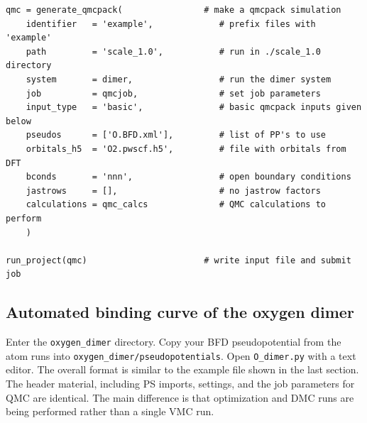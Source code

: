 \begin{shaded}
\begin{verbatim}
qmc = generate_qmcpack(                # make a qmcpack simulation 
    identifier   = 'example',             # prefix files with 'example'
    path         = 'scale_1.0',           # run in ./scale_1.0 directory
    system       = dimer,                 # run the dimer system
    job          = qmcjob,                # set job parameters
    input_type   = 'basic',               # basic qmcpack inputs given below    
    pseudos      = ['O.BFD.xml'],         # list of PP's to use
    orbitals_h5  = 'O2.pwscf.h5',         # file with orbitals from DFT
    bconds       = 'nnn',                 # open boundary conditions
    jastrows     = [],                    # no jastrow factors
    calculations = qmc_calcs              # QMC calculations to perform
    )
                       
run_project(qmc)                       # write input file and submit job
\end{verbatim}
\end{shaded}



\subsection{Automated binding curve of the oxygen dimer}
Enter the \texttt{oxygen\_dimer} directory.  Copy your BFD pseudopotential from the atom runs into \texttt{oxygen\_dimer/pseudopotentials}.  Open \texttt{O\_dimer.py} with a text editor.  The overall format is similar to the example file shown in the last section.  The header material, including PS imports, settings, and the job parameters for QMC are identical.  The main difference is that optimization and DMC runs are being performed rather than a single VMC run.  

